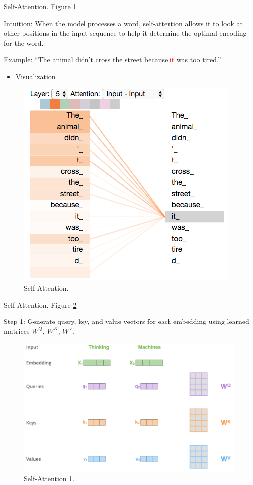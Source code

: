 \documentclass[english]{article}
\begin{document}
\item 
 {Self-Attention}.  Figure \ref{Self-Attention}

Intuition: When the model processes a word, self-attention allows it to look at other positions in the input sequence to help it determine the optimal encoding for the word.
 
Example: ``The animal didn't cross the street because \textcolor{red}{it} was too tired.''
\begin{itemize}
\item
\href{https://colab.research.google.com/github/tensorflow/tensor2tensor/blob/master/tensor2tensor/notebooks/hello_t2t.ipynb}{Visualization}
\end{itemize}
\begin{figure}
\centering
\includegraphics[height=0.4\linewidth]{self-attention.png}
    \caption{Self-Attention.}
    \label{Self-Attention}
\end{figure}
 

\item 
 {Self-Attention}.  Figure \ref{Self-Attention 1}

Step 1: Generate query, key, and value vectors for each embedding using learned matrices $W^Q$, $W^K$, $W^V$.
\begin{figure}
\centering
\includegraphics[height=0.5\linewidth]{self-attention1.png}
    \caption{Self-Attention 1.}
    \label{Self-Attention 1}
\end{figure}
 
\end{document}
